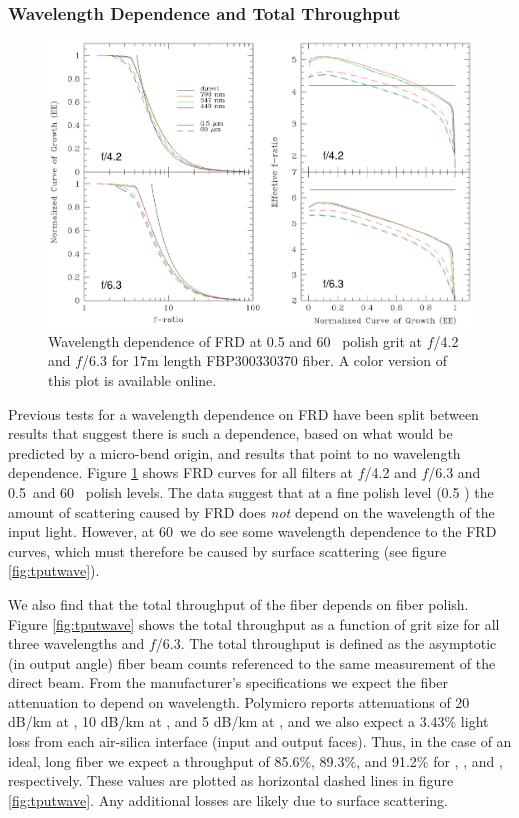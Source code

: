 \subsubsection{Wavelength Dependence and Total Throughput}
\label{FRD:sec:wavelength}
\begin{figure}[ht]
  \centering
  \includegraphics[width=\textwidth, trim=0 2.6in 0 0, clip=true]{FRD/figs/filters.eps}
  \caption{\fixspacing\label{fig:wave} Wavelength dependence of FRD at 0.5 and 60
   \mum\ polish grit at $f$/4.2 and $f$/6.3 for 17m length
    FBP300330370 fiber. A color version of this plot is available online.}
\end{figure}

Previous tests for a wavelength dependence on FRD have been split
between results that suggest there is such a
dependence\cite{Carrasco,Gloge72}, based on what would be predicted by
a micro-bend origin, and results that point to no wavelength
dependence\cite{Mab_04, Schmoll_03}. Figure \ref{fig:wave} shows FRD
curves for all filters at $f$/4.2 and $f$/6.3 and 0.5\mum\ and 60
\mum\ polish levels. The data suggest that at a fine polish level (0.5
\mum) the amount of scattering caused by FRD does {\it not} depend on
the wavelength of the input light. However, at 60\mum\ we do see some
wavelength dependence to the FRD curves, which  must therefore be
caused by surface scattering (see figure \ref{fig:tputwave}).

We also find that the total throughput of the fiber depends on
fiber polish. Figure \ref{fig:tputwave} shows the
total throughput as a function of grit size for all three wavelengths
and $f$/6.3. The total throughput is defined as the asymptotic (in output
 angle) fiber beam counts referenced to the same measurement of the direct
 beam. From the manufacturer's specifications
we expect the fiber attenuation to depend on wavelength. Polymicro
reports attenuations of 20 dB/km at \filtB, 10 dB/km at \filty, and 5
dB/km at \filtI, and we also expect a 3.43\% light loss from each
air-silica interface (input and output faces). Thus, in the case of an
ideal,  long fiber we expect a throughput of 85.6\%,
89.3\%, and 91.2\% for \filtB, \filty, and \filtI, respectively. These
values are plotted as horizontal dashed lines in figure
\ref{fig:tputwave}. Any additional losses are likely due to surface
scattering.

